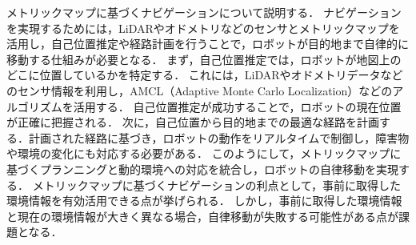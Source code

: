 メトリックマップに基づくナビゲーションについて説明する．
ナビゲーションを実現するためには，LiDARやオドメトリなどのセンサとメトリックマップを活用し，自己位置推定や経路計画を行うことで，ロボットが目的地まで自律的に移動する仕組みが必要となる．
まず，自己位置推定では，ロボットが地図上のどこに位置しているかを特定する．
これには，LiDARやオドメトリデータなどのセンサ情報を利用し，AMCL（Adaptive Monte Carlo Localization）などのアルゴリズムを活用する．
自己位置推定が成功することで，ロボットの現在位置が正確に把握される．
次に，自己位置から目的地までの最適な経路を計画する．計画された経路に基づき，ロボットの動作をリアルタイムで制御し，障害物や環境の変化にも対応する必要がある．
このようにして，メトリックマップに基づくプランニングと動的環境への対応を統合し，ロボットの自律移動を実現する．
メトリックマップに基づくナビゲーションの利点として，事前に取得した環境情報を有効活用できる点が挙げられる．
しかし，事前に取得した環境情報と現在の環境情報が大きく異なる場合，自律移動が失敗する可能性がある点が課題となる．